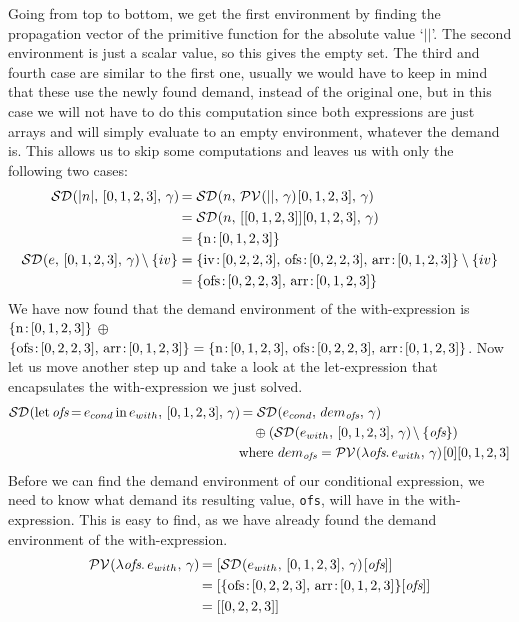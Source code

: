 \documentclass[../main.tex]{subfiles}
\begin{document}
\newpage
Going from top to bottom, we get the first environment by finding the propagation vector of the primitive function for the absolute value `$||$'. The second environment is just a scalar value, so this gives the empty set.
The third and fourth case are similar to the first one, usually we would have to keep in mind that these use the newly found demand, instead of the original one, but in this case we will not have to do this computation since both expressions are just arrays and will simply evaluate to an empty environment, whatever the demand is. This allows us to skip some computations and leaves us with only the following two cases:
\begin{align*}
    \sd{|n|}{[0,1,2,3]}
        &= \sd{n}{\pv{||}[0,1,2,3]} \\
        &= \sd{n}{[[0,1,2,3]][0,1,2,3]} \\
        &= \{ \dem{n}{[0,1,2,3]} \} \\
    \sd{e}{[0,1,2,3]} \setminus \{iv\}
        &= \{ \dem{iv}{[0,2,2,3]},\, \dem{ofs}{[0,2,2,3]},\, \dem{arr}{[0,1,2,3]} \} \setminus \{iv\} \\
        &= \{ \dem{ofs}{[0,2,2,3]},\, \dem{arr}{[0,1,2,3]} \}
\end{align*}
%
We have now found that the demand environment of the with-expression is $\{ \text{n}\colon\hspace{-2pt}[0,1,2,3] \}$ $\oplus$ $\{ \text{ofs}\colon\hspace{-2pt}[0,2,2,3],\, \text{arr}\colon\hspace{-2pt}[0,1,2,3] \} = \{ \text{n}\colon\hspace{-2pt}[0,1,2,3],\, \text{ofs}\colon\hspace{-2pt}[0,2,2,3],\, \text{arr}\colon\hspace{-2pt}[0,1,2,3] \}$. Now let us move another step up and take a look at the let-expression that encapsulates the with-expression we just solved.
\begin{align*}
    \mathcal{SD}\hspace{-1.2pt} \left( \text{let}\, \textit{ofs}\hspace{-1pt} =\hspace{-1pt} e_{cond}\, \text{in}\, e_{with},\, [0,1,2,3],\, \gamma \right) \hspace{-1pt}
        &= \mathcal{SD}\hspace{-1.2pt} \left( e_{cond},\, dem_{\textit{ofs}},\, \gamma \right) \hspace{-1pt}
            \\&\hspace{1em}\oplus (\mathcal{SD}\hspace{-1.2pt} \left( e_{with},\, [0,1,2,3],\, \gamma \right) \hspace{-1pt} \setminus \{\textit{ofs}\}) \\
        &\text{where } dem_{\textit{ofs}} = \mathcal{PV}\hspace{-1.2pt} \left( \lambda \textit{ofs}.\, e_{with},\, \gamma \right) \hspace{-1pt}[0][0,1,2,3]
\end{align*}
%
Before we can find the demand environment of our conditional expression, we need to know what demand its resulting value, \texttt{ofs}, will have in the with-expression. This is easy to find, as we have already found the demand environment of the with-expression.
\begin{align*}
    \mathcal{PV}\hspace{-1.2pt} \left( \lambda \textit{ofs}.\, e_{with},\, \gamma \right) \hspace{-1pt}
        &= [\mathcal{SD}\hspace{-1.2pt} \left( e_{with},\, [0,1,2,3],\, \gamma \right) \hspace{-1pt}[\textit{ofs}]] \\
        &= [\{ \text{ofs}\colon\hspace{-2pt}[0,2,2,3],\, \text{arr}\colon\hspace{-2pt}[0,1,2,3] \}[\textit{ofs}]] \\
        &= [[0,2,2,3]]
\end{align*}
\end{document}
